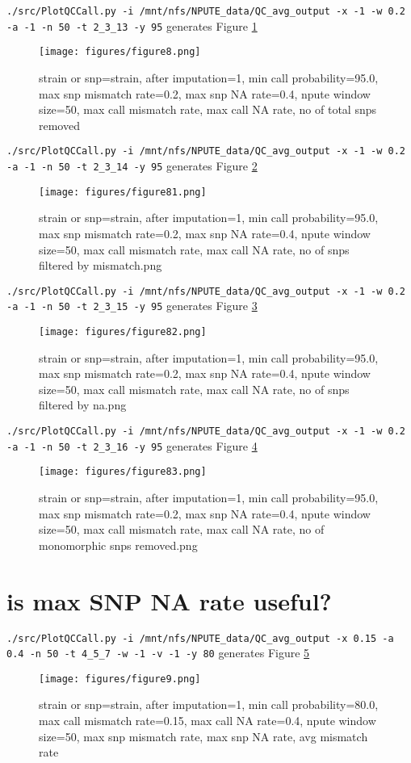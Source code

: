 \documentclass[a4paper,10pt]{article}
\begin{document}
\verb+./src/PlotQCCall.py -i /mnt/nfs/NPUTE_data/QC_avg_output -x -1 -w 0.2 -a -1 -n 50 -t 2_3_13 -y 95+ generates Figure \ref{f8}
\begin{figure}
\texttt{[image: figures/figure8.png]}
\caption{strain or snp=strain, after imputation=1, min call probability=95.0, max snp mismatch rate=0.2, max snp NA rate=0.4, npute window size=50, max call mismatch rate, max call NA rate, no of total snps removed}\label{f8}
\end{figure}

\verb+./src/PlotQCCall.py -i /mnt/nfs/NPUTE_data/QC_avg_output -x -1 -w 0.2 -a -1 -n 50 -t 2_3_14 -y 95+ generates Figure \ref{f81}
\begin{figure}
\texttt{[image: figures/figure81.png]}
\caption{strain or snp=strain, after imputation=1, min call probability=95.0, max snp mismatch rate=0.2, max snp NA rate=0.4, npute window size=50, max call mismatch rate, max call NA rate, no of snps filtered by mismatch.png}\label{f81}
\end{figure}


\verb+./src/PlotQCCall.py -i /mnt/nfs/NPUTE_data/QC_avg_output -x -1 -w 0.2 -a -1 -n 50 -t 2_3_15 -y 95+ generates Figure \ref{f82}
\begin{figure}
\texttt{[image: figures/figure82.png]}
\caption{strain or snp=strain, after imputation=1, min call probability=95.0, max snp mismatch rate=0.2, max snp NA rate=0.4, npute window size=50, max call mismatch rate, max call NA rate, no of snps filtered by na.png}\label{f82}
\end{figure}

\verb+./src/PlotQCCall.py -i /mnt/nfs/NPUTE_data/QC_avg_output -x -1 -w 0.2 -a -1 -n 50 -t 2_3_16 -y 95+ generates Figure \ref{f83}
\begin{figure}
\texttt{[image: figures/figure83.png]}
\caption{strain or snp=strain, after imputation=1, min call probability=95.0, max snp mismatch rate=0.2, max snp NA rate=0.4, npute window size=50, max call mismatch rate, max call NA rate, no of monomorphic snps removed.png}\label{f83}
\end{figure}
\section{is max SNP NA rate useful?}

\verb+./src/PlotQCCall.py -i /mnt/nfs/NPUTE_data/QC_avg_output -x 0.15 -a 0.4 -n 50 -t 4_5_7 -w -1 -v -1 -y 80+ generates Figure \ref{f9}
\begin{figure}
\texttt{[image: figures/figure9.png]}
\caption{strain or snp=strain, after imputation=1, min call probability=80.0, max call mismatch rate=0.15, max call NA rate=0.4, npute window size=50, max snp mismatch rate, max snp NA rate, avg mismatch rate}\label{f9}
\end{figure}
\end{document}
